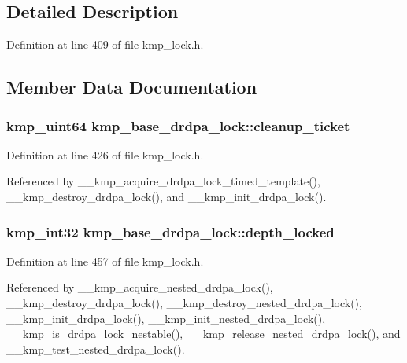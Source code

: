 \subsection{Detailed Description}


Definition at line 409 of file kmp\-\_\-lock.\-h.



\subsection{Member Data Documentation}
\hypertarget{structkmp__base__drdpa__lock_a6b95d65ec5cc5135a0eed70eafdc11ed}{
\subsubsection[{cleanup\-\_\-ticket}]{\setlength{\rightskip}{0pt plus 5cm}kmp\-\_\-uint64 kmp\-\_\-base\-\_\-drdpa\-\_\-lock\-::cleanup\-\_\-ticket}}\label{structkmp__base__drdpa__lock_a6b95d65ec5cc5135a0eed70eafdc11ed}


Definition at line 426 of file kmp\-\_\-lock.\-h.



Referenced by \-\_\-\-\_\-kmp\-\_\-acquire\-\_\-drdpa\-\_\-lock\-\_\-timed\-\_\-template(), \-\_\-\-\_\-kmp\-\_\-destroy\-\_\-drdpa\-\_\-lock(), and \-\_\-\-\_\-kmp\-\_\-init\-\_\-drdpa\-\_\-lock().

\hypertarget{structkmp__base__drdpa__lock_a8ab4634e1e61fe099058e01b2be89482}{
\subsubsection[{depth\-\_\-locked}]{\setlength{\rightskip}{0pt plus 5cm}kmp\-\_\-int32 kmp\-\_\-base\-\_\-drdpa\-\_\-lock\-::depth\-\_\-locked}}\label{structkmp__base__drdpa__lock_a8ab4634e1e61fe099058e01b2be89482}


Definition at line 457 of file kmp\-\_\-lock.\-h.



Referenced by \-\_\-\-\_\-kmp\-\_\-acquire\-\_\-nested\-\_\-drdpa\-\_\-lock(), \-\_\-\-\_\-kmp\-\_\-destroy\-\_\-drdpa\-\_\-lock(), \-\_\-\-\_\-kmp\-\_\-destroy\-\_\-nested\-\_\-drdpa\-\_\-lock(), \-\_\-\-\_\-kmp\-\_\-init\-\_\-drdpa\-\_\-lock(), \-\_\-\-\_\-kmp\-\_\-init\-\_\-nested\-\_\-drdpa\-\_\-lock(), \-\_\-\-\_\-kmp\-\_\-is\-\_\-drdpa\-\_\-lock\-\_\-nestable(), \-\_\-\-\_\-kmp\-\_\-release\-\_\-nested\-\_\-drdpa\-\_\-lock(), and \-\_\-\-\_\-kmp\-\_\-test\-\_\-nested\-\_\-drdpa\-\_\-lock().

